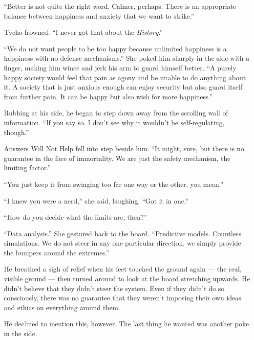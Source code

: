 ``Better is not quite the right word. Calmer, perhaps. There is an appropriate balance between happiness and anxiety that we want to strike.''

Tycho frowned. ``I never got that about the \emph{History}.''

``We do not want people to be too happy because unlimited happiness is a happiness with no defense mechanisms.'' She poked him sharply in the side with a finger, making him wince and jerk his arm to guard himself better. ``A purely happy society would feel that pain as agony and be unable to do anything about it. A society that is just anxious enough can enjoy security but also guard itself from further pain. It can be happy but also wish for more happiness.''

Rubbing at his side, he began to step down away from the scrolling wall of information. ``If you say so. I don't see why it wouldn't be self-regulating, though.''

Answers Will Not Help fell into step beside him. ``It might, sure, but there is no guarantee in the face of immortality. We are just the safety mechanism, the limiting factor.''

``You just keep it from swinging too far one way or the other, you mean.''

``I knew you were a nerd,'' she said, laughing. ``Got it in one.''

``How do you decide what the limits are, then?''

``Data analysis.'' She gestured back to the board. ``Predictive models. Countless simulations. We do not steer in any one particular direction, we simply provide the bumpers around the extremes.''

He breathed a sigh of relief when his feet touched the ground again — the real, visible ground — then turned around to look at the board stretching upwards. He didn't believe that they didn't steer the system. Even if they didn't do so consciously, there was no guarantee that they weren't imposing their own ideas and ethics on everything around them.

He declined to mention this, however. The last thing he wanted was another poke in the side.
